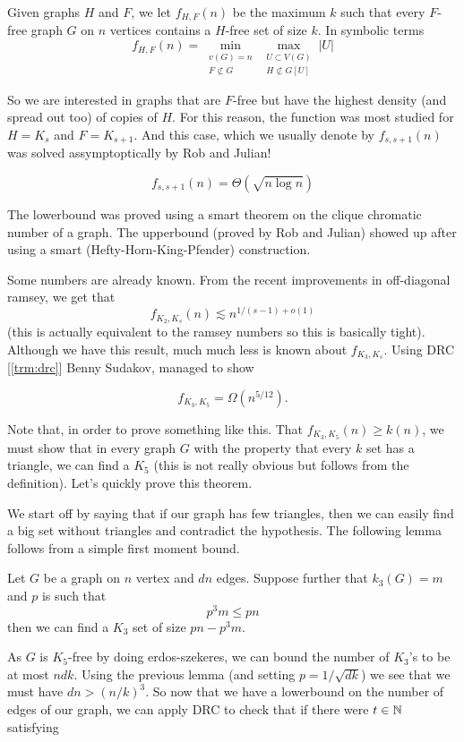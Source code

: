 \begin{definition}
	Given graphs $H$ and $F$, we let $f_{H,F}(n)$ be the maximum $k$ such
	that every $F$-free graph $G$ on $n$ vertices
	contains a $H$-free set of size $k$. In symbolic terms
	\[
		f_{H,F}(n) = \min_{\substack{v(G) = n\\F \not \subset G}}
		\max_{\substack{U \subset V(G)\\ H \not\subset G[U]}} |U|
	\]
\end{definition}

So we are interested in graphs that are $F$-free but have the highest
density (and spread out too)
of copies of $H$. For this reason, the function was most studied for
$H = K_s$ and $F = K_{s+1}$. And this
case, which we usually denote by $f_{s,s+1}(n)$ was solved
assymptoptically by Rob and Julian!

\begin{theorem}
	\[f_{s,s+1}(n) = \Theta(\sqrt{n \log n})\]
\end{theorem}

The lowerbound was proved using a smart theorem on the clique
chromatic number of a graph. The upperbound
(proved by Rob and Julian) showed up after using a smart
(Hefty-Horn-King-Pfender) construction.

Some numbers are already known. From the recent improvements in
off-diagonal ramsey, we get that
\[
	f_{K_2, K_s}(n) \lesssim n^{1/(s-1) + o(1)}
\]
(this is actually equivalent to the ramsey numbers so this is
basically tight). Although we have this result,
much much less is known about $f_{K_3, K_s}$. Using DRC [\ref{trm:drc}]
Benny Sudakov, managed to show
\begin{theorem}
	\[
		f_{K_3, K_5} = \Omega(n^{5/12}).
	\]
\end{theorem}
Note that, in order to prove something like this. That $f_{K_3,
K_5}(n) \geq k(n)$, we must show that
in every graph $G$ with the property that every $k$ set has a
triangle, we can find a $K_5$ (this is not really obvious but follows
from the definition). Let's quickly prove this theorem.

We start off by saying that if our graph has few triangles, then we
can easily find a big set without triangles and contradict the hypothesis.
The following lemma follows from a simple first moment bound.
\begin{lemma}
	Let $G$ be a graph on $n$ vertex and $dn$ edges. Suppose further that
	$k_3(G) = m$ and $p$ is such that
	\[p^3m \leq pn\]
	then we can find a $K_3$ set of size $pn - p^3m$.
\end{lemma}
As $G$ is $K_5$-free by doing erdos-szekeres, we can bound the number
of $K_3$'s to be at most $ndk$.
Using the previous lemma (and setting $p = 1/\sqrt{dk}$) we see that
we must have $dn > (n/k)^3$. So
now that we have a lowerbound on the number of edges of our graph, we
can apply DRC to check that
if there were $t \in \mathbb{N}$ satisfying

